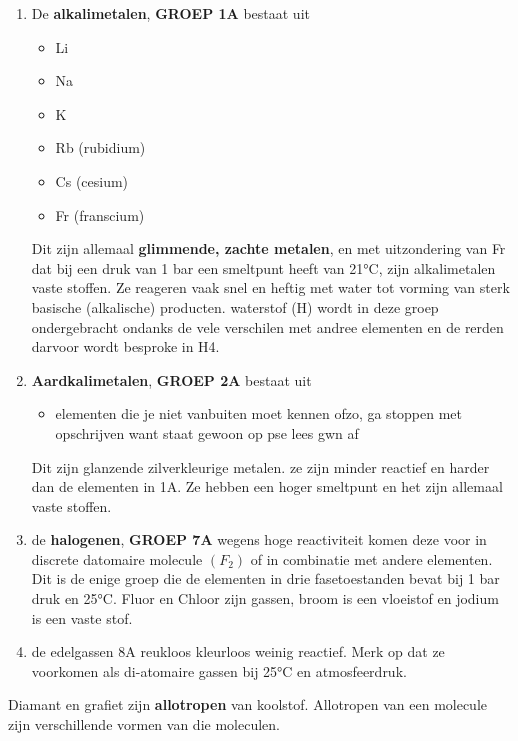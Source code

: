 \documentclass{report}
\begin{document}
 \begin{enumerate}
 	\item De \textbf{alkalimetalen}, \textbf{GROEP 1A}
bestaat uit
\begin{itemize}
	\item Li
	\item Na
	\item K
	\item Rb (rubidium)
	\item Cs (cesium)
	\item Fr (franscium)
\end{itemize}
Dit zijn allemaal \textbf{glimmende, zachte metalen}, en met uitzondering van Fr dat bij een druk van 1 bar een smeltpunt heeft van 21°C, zijn alkalimetalen vaste stoffen.
Ze reageren vaak snel en heftig met water tot vorming van sterk basische (alkalische) producten.
waterstof (H) wordt in deze groep ondergebracht ondanks de vele verschilen met andree elementen en de rerden darvoor wordt besproke in H4.
\item \textbf{Aardkalimetalen}, \textbf{GROEP 2A} 
	bestaat uit
	\begin{itemize}
		\item elementen die je niet vanbuiten moet kennen ofzo, ga stoppen met opschrijven want staat gewoon op pse lees gwn af
	\end{itemize}
	Dit zijn glanzende zilverkleurige metalen. 
ze zijn minder reactief en harder dan de elementen in 1A. Ze hebben een hoger smeltpunt en het zijn allemaal vaste stoffen.


\item de \textbf{halogenen}, \textbf{GROEP 7A}
	wegens hoge reactiviteit komen deze voor in discrete datomaire molecule $(F_{2} )$ of in combinatie met andere elementen. Dit is de enige groep die de elementen in drie fasetoestanden bevat bij 1 bar druk en 25°C. Fluor en Chloor zijn gassen, broom is een vloeistof en jodium is een vaste stof.
\item de edelgassen 8A
	reukloos kleurloos weinig reactief.
	Merk op dat ze voorkomen als di-atomaire gassen bij 25°C en atmosfeerdruk.
 \end{enumerate}


 
 Diamant en grafiet zijn \textbf{allotropen} van koolstof. Allotropen van een molecule zijn verschillende vormen van die moleculen.
 
\end{document}
